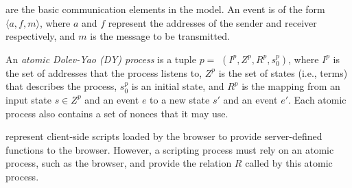  are the basic communication elements in the model. An event is of the form $\langle a, f, m \rangle$, where $a$ and $f$ represent the addresses of the sender and receiver respectively, and $m$ is the message to be transmitted.

 An {\em atomic Dolev-Yao (DY) process} is a tuple $p=$ $(I^p, Z^p, R^p,s_0^p )$, where $I^p$ is the set of addresses that the process listens to, $Z^p$ is the set of states (i.e., terms) that describes the process, $s_0^p$ is an initial state, and $R^p$ is the mapping from an input state $s \in Z^p$ and an event $e$ to a new state $s'$ and an event $e'$. %
Each atomic process also contains a set of nonces that it may use.

 represent client-side scripts loaded by the browser to provide server-defined functions to the browser. However, a scripting process must rely on an atomic process, such as the browser, and provide the relation $R$ called by this atomic process.


